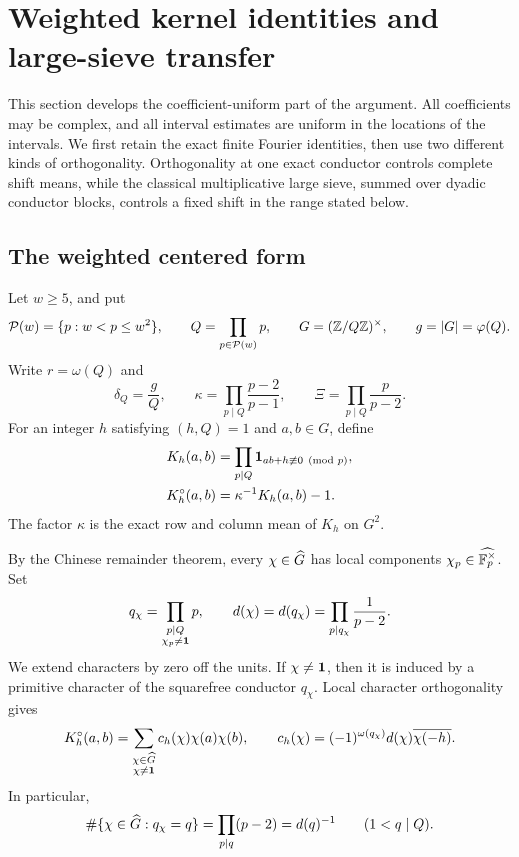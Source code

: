 \section{Weighted kernel identities and large-sieve transfer}
\label{sec:weighted-kernel-large-sieve}

This section develops the coefficient-uniform part of the argument.  All
coefficients may be complex, and all interval estimates are uniform in the
locations of the intervals.  We first retain the exact finite Fourier
identities, then use two different kinds of orthogonality.  Orthogonality at
one exact conductor controls complete shift means, while the classical
multiplicative large sieve, summed over dyadic conductor blocks, controls a
fixed shift in the range stated below.

\subsection{The weighted centered form}

Let $w\geq 5$, and put
\begin{equation}\label{eq:weighted-Q-window}
 \mathcal P(w)=\{p:w<p\leq w^2\},
 \qquad
 Q=\prod_{p\in\mathcal P(w)}p,
 \qquad
 G=(\mathbb Z/Q\mathbb Z)^\times,
 \qquad
 g=|G|=\varphi(Q).
\end{equation}
Write $r=\omega(Q)$ and
\begin{equation}\label{eq:weighted-local-products}
 \delta_Q=\frac{g}{Q},
 \qquad
 \kappa=\prod_{p\mid Q}\frac{p-2}{p-1},
 \qquad
 \Xi=\prod_{p\mid Q}\frac{p}{p-2}.
\end{equation}
For an integer $h$ satisfying $(h,Q)=1$ and $a,b\in G$, define
\begin{align}
 K_h(a,b)
  &=\prod_{p\mid Q}\mathbf 1_{ab+h\not\equiv0\pmod p},
  \label{eq:weighted-binary-kernel}\\
 K_h^\circ(a,b)
  &=\kappa^{-1}K_h(a,b)-1.
  \label{eq:weighted-centered-kernel}
\end{align}
The factor $\kappa$ is the exact row and column mean of $K_h$ on $G^2$.

By the Chinese remainder theorem, every $\chi\in\widehat G$ has local components
$\chi_p\in\widehat{\mathbb F_p^\times}$.  Set
\begin{equation}\label{eq:weighted-character-conductor}
 q_\chi=\prod_{\substack{p\mid Q\\\chi_p\ne\mathbf 1}}p,
 \qquad
 d(\chi)=d(q_\chi)
 =\prod_{p\mid q_\chi}\frac1{p-2}.
\end{equation}
We extend characters by zero off the units.  If $\chi\ne\mathbf 1$, then it is
induced by a primitive character of the squarefree conductor $q_\chi$.
Local character orthogonality gives
\begin{equation}\label{eq:weighted-exact-kernel-expansion}
 K_h^\circ(a,b)
 =\sum_{\substack{\chi\in\widehat G\\\chi\ne\mathbf 1}}
 c_h(\chi)\chi(a)\chi(b),
 \qquad
 c_h(\chi)
 =(-1)^{\omega(q_\chi)}d(\chi)\overline{\chi(-h)}.
\end{equation}
In particular,
\begin{equation}\label{eq:weighted-exact-conductor-count}
 \#\{\chi\in\widehat G:q_\chi=q\}
 =\prod_{p\mid q}(p-2)=d(q)^{-1}
 \qquad (1<q\mid Q).
\end{equation}

